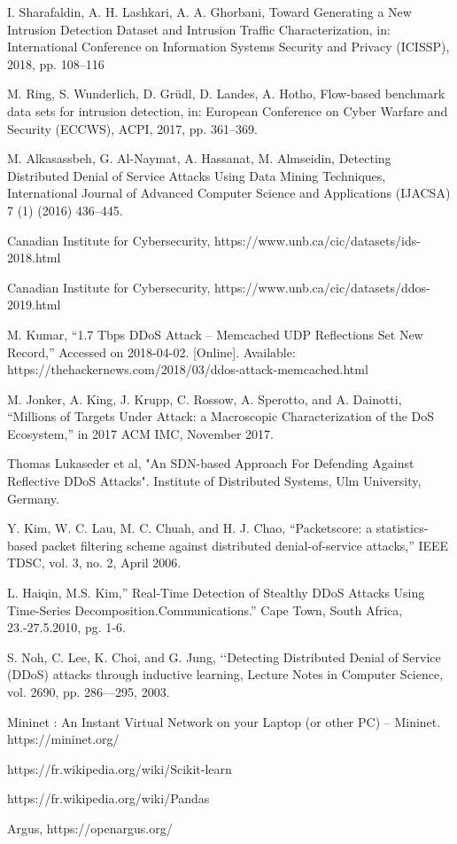 \begin{thebibliography}{9}
\bibitem{}
I. Sharafaldin, A. H. Lashkari, A. A. Ghorbani, Toward Generating a New Intrusion Detection Dataset and Intrusion Traffic Characterization, in: International Conference on Information Systems Security and Privacy (ICISSP), 2018, pp. 108–116

\bibitem{}
M. Ring, S. Wunderlich, D. Grüdl, D. Landes, A. Hotho, Flow-based benchmark data sets for intrusion detection, in: European Conference on Cyber Warfare and Security (ECCWS), ACPI, 2017, pp. 361–369.

\bibitem{}
M. Alkasassbeh, G. Al-Naymat, A. Hassanat, M. Almseidin, Detecting Distributed Denial of Service Attacks Using Data Mining Techniques, International Journal of Advanced Computer Science and Applications (IJACSA) 7 (1) (2016) 436–445.

\bibitem{}
Canadian Institute for Cybersecurity, https://www.unb.ca/cic/datasets/ids-2018.html

\bibitem{}
Canadian Institute for Cybersecurity, https://www.unb.ca/cic/datasets/ddos-2019.html

\bibitem{}
M. Kumar, “1.7 Tbps DDoS Attack – Memcached UDP Reflections Set New Record,” Accessed on 2018-04-02. [Online]. Available: https://thehackernews.com/2018/03/ddos-attack-memcached.html

\bibitem{}
M. Jonker, A. King, J. Krupp, C. Rossow, A. Sperotto, and A. Dainotti, “Millions of Targets Under Attack: a Macroscopic Characterization of the DoS Ecosystem,” in 2017 ACM IMC, November 2017.

\bibitem{}
Thomas Lukaseder et al, "An SDN-based Approach For Defending Against Reflective DDoS Attacks". Institute of Distributed Systems, Ulm University, Germany.

\bibitem{}
Y. Kim, W. C. Lau, M. C. Chuah, and H. J. Chao, “Packetscore: a statistics-based packet filtering scheme against distributed denial-of-service attacks,” IEEE TDSC, vol. 3, no. 2, April 2006.

\bibitem{}
L. Haiqin, M.S. Kim,” Real-Time Detection of Stealthy DDoS Attacks Using Time-Series Decomposition.Communications.”
Cape Town, South Africa, 23.-27.5.2010, pg. 1-6.

\bibitem{}
S. Noh, C. Lee, K. Choi, and G. Jung, ‘‘Detecting Distributed Denial of Service (DDoS) attacks through inductive learning, Lecture Notes in Computer Science, vol. 2690, pp. 286---295, 2003.

\bibitem{}
Mininet : An Instant Virtual Network on your Laptop (or other PC) – Mininet. https://mininet.org/

\bibitem{}
https://fr.wikipedia.org/wiki/Scikit-learn

\bibitem{}
https://fr.wikipedia.org/wiki/Pandas

\bibitem{}
Argus, https://openargus.org/

\end{thebibliography}